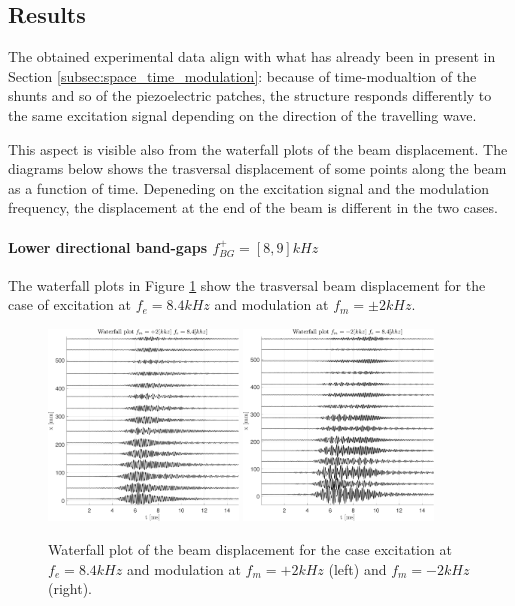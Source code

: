 \subsection{Results}
\label{subsec:nonreciprocal_behavior_results}

The obtained experimental data align with what has already been in present in Section \ref{subsec:space_time_modulation}: because of time-modualtion of the shunts and so of the piezoelectric patches, the structure responds differently to the same excitation signal depending on the direction of the travelling wave.

This aspect is visible also from the waterfall plots of the beam displacement.
The diagrams below shows the trasversal displacement of some points along the beam as a function of time.
Depeneding on the excitation signal and the modulation frequency, the displacement at the end of the beam is different in the two cases.

\paragraph{Lower directional band-gaps $f_{BG}^+ = [8, 9] kHz$}

The waterfall plots in Figure \ref{fig:nonreciprocal_behavior_8p4kHz} show the trasversal beam displacement for the case of excitation at $f_e = 8.4 kHz$ and modulation at $f_m = \pm 2 kHz$.

\begin{figure}[H]
    \centering
    \includegraphics[width=0.45\textwidth]{img/MATLAB/EXP_Scan_time_narrow8p4kHz_2000plus.unv.pdf}
    \hspace{1cm}
    \includegraphics[width=0.45\textwidth]{img/MATLAB/EXP_Scan_time_narrow8p4kHz_2000minus.unv.pdf}
    \caption{Waterfall plot of the beam displacement for the case excitation at $f_e = 8.4 kHz$ and modulation at $f_m = +2 kHz$ (left) and $f_m = -2 kHz$ (right).}
    \label{fig:nonreciprocal_behavior_8p4kHz}
\end{figure}


